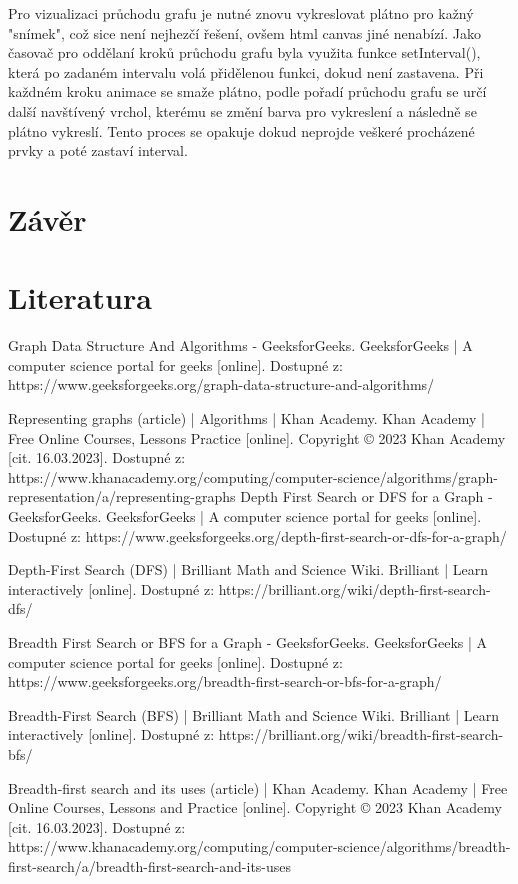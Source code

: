 \documentclass[12pt, titlepage, a4paper]{article}
\begin{document}
Pro vizualizaci průchodu grafu je nutné znovu vykreslovat plátno pro kažný
"snímek", což sice není nejhezčí řešení, ovšem html canvas jiné nenabízí.
Jako časovač pro oddělaní kroků průchodu grafu byla využita funkce setInterval(),
která po zadaném intervalu volá přidělenou funkci, dokud není zastavena. Při každném
kroku animace se smaže plátno, podle pořadí průchodu grafu se určí další navštívený
vrchol, kterému se změní barva pro vykreslení a následně se plátno vykreslí. Tento
proces se opakuje dokud neprojde veškeré procházené prvky a poté zastaví interval.

\section{Závěr}

\section{Literatura}
\begin{thebibliography}{99}
    Graph Data Structure And Algorithms - GeeksforGeeks. GeeksforGeeks | A computer science
    portal for geeks [online]. Dostupné z: https://www.geeksforgeeks.org/graph-data-structure-and-algorithms/

    Representing graphs (article) | Algorithms | Khan Academy. Khan Academy | Free Online Courses,
    Lessons Practice [online]. Copyright © 2023 Khan Academy [cit. 16.03.2023]. Dostupné z: https://www.khanacademy.org/computing/computer-science/algorithms/graph-representation/a/representing-graphs
    Depth First Search or DFS for a Graph - GeeksforGeeks. GeeksforGeeks | A computer science portal for geeks [online]. Dostupné z: https://www.geeksforgeeks.org/depth-first-search-or-dfs-for-a-graph/

    Depth-First Search (DFS) | Brilliant Math and Science Wiki. Brilliant | Learn interactively [online]. Dostupné z: https://brilliant.org/wiki/depth-first-search-dfs/

    Breadth First Search or BFS for a Graph - GeeksforGeeks. GeeksforGeeks | A computer science portal for geeks [online]. Dostupné z: https://www.geeksforgeeks.org/breadth-first-search-or-bfs-for-a-graph/

    Breadth-First Search (BFS) | Brilliant Math and Science Wiki. Brilliant | Learn interactively [online]. Dostupné z: https://brilliant.org/wiki/breadth-first-search-bfs/

    Breadth-first search and its uses (article) | Khan Academy. Khan Academy | Free Online Courses, Lessons and Practice [online]. Copyright © 2023 Khan Academy [cit. 16.03.2023]. Dostupné z: https://www.khanacademy.org/computing/computer-science/algorithms/breadth-first-search/a/breadth-first-search-and-its-uses
\end{thebibliography}
\end{document}
